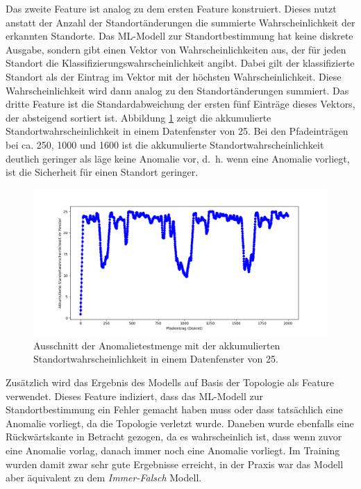 Das zweite Feature ist analog zu dem ersten Feature konstruiert.
Dieses nutzt anstatt der Anzahl der Standortänderungen die summierte Wahrscheinlichkeit der erkannten Standorte.
Das ML-Modell zur Standortbestimmung hat keine diskrete Ausgabe, sondern gibt einen Vektor von Wahrscheinlichkeiten aus,
der für jeden Standort die Klassifizierungswahrscheinlichkeit angibt.
Dabei gilt der klassifizierte Standort als der Eintrag im Vektor mit der höchsten Wahrscheinlichkeit.
Diese Wahrscheinlichkeit wird dann analog zu den Standortänderungen summiert.
Das dritte Feature ist die Standardabweichung der ersten fünf Einträge dieses Vektors, der absteigend sortiert ist.
Abbildung \ref{fig:window_confidence} zeigt die akkumulierte Standortwahrscheinlichkeit in einem Datenfenster von 25.
Bei den Pfadeinträgen bei ca. 250, 1000 und 1600 ist die akkumulierte Standortwahrscheinlichkeit deutlich geringer als läge keine Anomalie vor,
d.~h. wenn eine Anomalie vorliegt, ist die Sicherheit für einen Standort geringer.
\begin{figure}[h!]
    \centering
    \includegraphics[width=\linewidth]{images/feature_window_confidence.png}
    \caption{Ausschnitt der Anomalietestmenge mit der akkumulierten Standortwahrscheinlichkeit in einem Datenfenster von 25.}
    \label{fig:window_confidence}
\end{figure}
\newline
\newline
Zusätzlich wird das Ergebnis des Modells auf Basis der Topologie als Feature verwendet.
Dieses Feature indiziert, dass das ML-Modell zur Standortbestimmung ein Fehler gemacht haben muss
oder dass tatsächlich eine Anomalie vorliegt, da die Topologie verletzt wurde.
\newline
\newline
Daneben wurde ebenfalls eine Rückwärtskante in Betracht gezogen,
da es wahrscheinlich ist, dass wenn zuvor eine Anomalie vorlag, danach immer noch eine Anomalie vorliegt.
Im Training wurden damit zwar sehr gute Ergebnisse erreicht,
in der Praxis war das Modell aber äquivalent zu dem \textit{Immer-Falsch} Modell.
